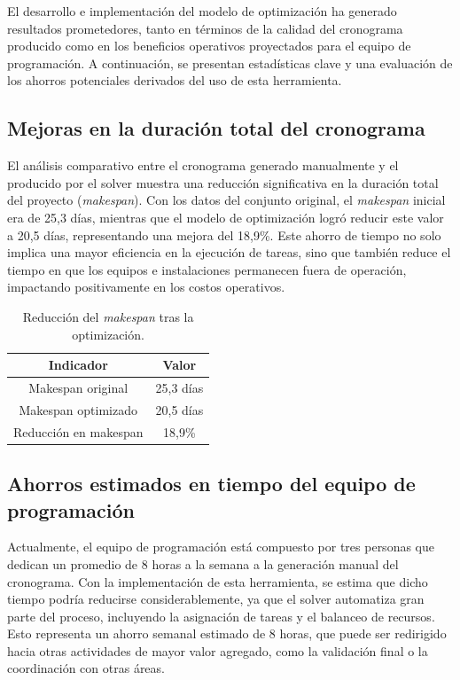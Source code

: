 \documentclass{article}
\begin{document}
El desarrollo e implementación del modelo de optimización ha generado resultados prometedores, tanto en términos de la calidad del cronograma producido como en los beneficios operativos proyectados para el equipo de programación. A continuación, se presentan estadísticas clave y una evaluación de los ahorros potenciales derivados del uso de esta herramienta.

\subsection{Mejoras en la duración total del cronograma}

El análisis comparativo entre el cronograma generado manualmente y el producido por el solver muestra una reducción significativa en la duración total del proyecto (\textit{makespan}). Con los datos del conjunto original, el \textit{makespan} inicial era de 25,3 días, mientras que el modelo de optimización logró reducir este valor a 20,5 días, representando una mejora del 18,9\%. Este ahorro de tiempo no solo implica una mayor eficiencia en la ejecución de tareas, sino que también reduce el tiempo en que los equipos e instalaciones permanecen fuera de operación, impactando positivamente en los costos operativos.

\begin{table}[H]
\centering
\begin{tabular}{|c|c|}
\hline
\textbf{Indicador}            & \textbf{Valor}       \\ \hline
Makespan original             & 25,3 días           \\ \hline
Makespan optimizado           & 20,5 días           \\ \hline
Reducción en makespan         & 18,9\%              \\ \hline
\end{tabular}
\caption{Reducción del \textit{makespan} tras la optimización.}
\label{tab:makespan}
\end{table}

\subsection{Ahorros estimados en tiempo del equipo de programación}

Actualmente, el equipo de programación está compuesto por tres personas que dedican un promedio de 8 horas a la semana a la generación manual del cronograma. Con la implementación de esta herramienta, se estima que dicho tiempo podría reducirse considerablemente, ya que el solver automatiza gran parte del proceso, incluyendo la asignación de tareas y el balanceo de recursos. Esto representa un ahorro semanal estimado de 8 horas, que puede ser redirigido hacia otras actividades de mayor valor agregado, como la validación final o la coordinación con otras áreas.
\end{document}
